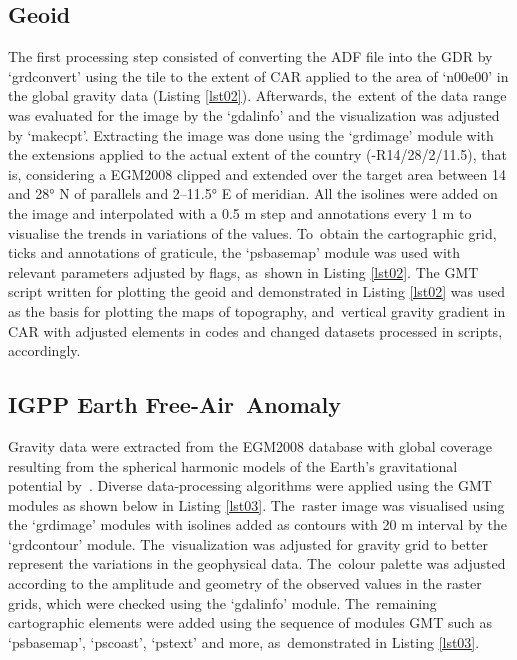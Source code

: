 \documentclass[minerals,article,accept,pdftex,moreauthors]{Definitions/mdpi}
\begin{document}
\subsection{Geoid}
The first processing step consisted of converting the ADF file into the GDR by `grdconvert' using the tile to the extent of CAR applied to the area of `n00e00' in the global gravity data (Listing \ref{lst02}). Afterwards, the~extent of the data range was evaluated for the image {by} the `gdalinfo'{ }and the {visualization} was adjusted{ by} `makecpt'{. }Extracting the image was done using the `grdimage' module with the extensions applied to the actual extent of the country (-R14/28/2/11.5), %
that is, considering a EGM2008 clipped and extended over the target area between 14 and 28° N of parallels and 2--11.5° E of meridian. All the isolines were added on the image and interpolated with a 0.5 m step and annotations every 1 m to visualise the trends in variations of the values. To~obtain the cartographic grid, ticks and annotations of graticule, the `psbasemap' module was used with relevant parameters adjusted by flags, as~shown in Listing \ref{lst02}.{ }The GMT script written for plotting the geoid and demonstrated in Listing \ref{lst02} was used as the basis for plotting the maps of topography, and~vertical gravity gradient in CAR with adjusted elements in codes and changed datasets processed in scripts, accordingly.

\subsection{IGPP Earth Free-Air~Anomaly}
Gravity data were extracted from the EGM2008 database with global coverage resulting from the spherical harmonic models of the Earth's gravitational potential by~\cite{Pavlis}. Diverse data-processing algorithms were applied using the GMT modules as shown below in Listing \ref{lst03}. The~raster image was visualised using the `grdimage' modules with isolines added as contours with 20 m interval by the `grdcontour' module. The~{visualization} was{ adjusted }for gravity grid {to better represent} the {variations in the }geophysical data. The~colour palette was adjusted according to the amplitude and geometry of the observed values in the raster grids, which were checked using the `gdalinfo' module. The~remaining cartographic elements were added using the sequence of modules GMT such as `psbasemap', `pscoast', `pstext' and more, as~demonstrated in Listing \ref{lst03}.
\end{document}
